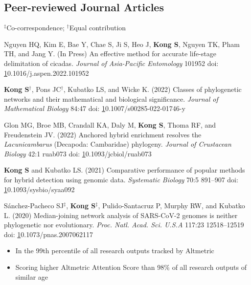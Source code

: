\documentclass[11pt]{article}
\begin{document}

\subsection*{Peer-reviewed Journal Articles}
$^\ddag$Co-correspondence; $^\dag$Equal contribution
\begin{etaremune}

\item Nguyen HQ, Kim E, Bae Y, Chae S, Ji S, Heo J, \textbf{Kong S}, Nguyen TK, Pham TH, and Jang Y. (In Press) An effective method for accurate life-stage delimitation of cicadas. \textit{Journal of Asia-Pacific Entomology} 101952 doi: \href{https://doi.org/10.1016/j.aspen.2022.101952}10.1016/j.aspen.2022.101952

\item \textbf{Kong S}$^\dag$, Pons JC$^\dag$, Kubatko LS, and Wicke K. (2022) Classes of phylogenetic networks and their mathematical and biological significance. \textit{Journal of Mathematical Biology} 84:47 doi: \href{https://doi.org/10.1007/s00285-022-01746-y}10.1007/s00285-022-01746-y

\item Glon MG, Broe MB, Crandall KA, Daly M, \textbf{Kong S}, Thoma RF, and Freudenstein JV. (2022) Anchored hybrid enrichment resolves the \textit{Lacunicambarus} (Decapoda: Cambaridae) phylogeny. \textit{Journal of Crustacean Biology} 42:1 ruab073 doi: \href{https://doi.org/10.1093/jcbiol/ruab073}10.1093/jcbiol/ruab073

\item \textbf{Kong S} and Kubatko LS. (2021) Comparative performance of popular methods for hybrid detection using genomic data. \textit {Systematic Biology} 70:5 891–907 doi: \href{https://doi.org/10.1093/sysbio/syaa092}10.1093/sysbio/syaa092

\item  Sánchez-Pacheco SJ{$^\ddag$}, \textbf{Kong S}{$^\ddag$}, Pulido-Santacruz P, Murphy RW, and Kubatko L. (2020) Median-joining network analysis of SARS-CoV-2 genomes is neither phylogenetic nor evolutionary. \textit{Proc. Natl. Acad. Sci. U.S.A} 117:23 12518–12519 doi: \href{https://doi.org/10.1073/pnas.2007062117}10.1073/pnas.2007062117
	
	\begin{itemize}\item In the 99th percentile of all research outputs tracked by Altmetric
				\item Scoring higher Altmetric Attention Score than 98\% of all research outputs of similar age \end{itemize}
	

\end{etaremune}
\end{document}
